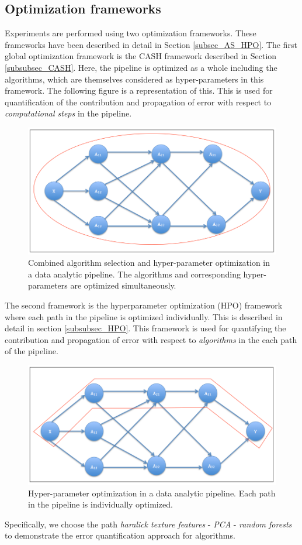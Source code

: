 \subsection{Optimization frameworks}
\label{frameworks}
Experiments are performed using two optimization frameworks. These frameworks have been described in detail in Section \ref{subsec_AS_HPO}. 
The first global optimization framework is the CASH framework described in Section \ref{subsubsec_CASH}. Here, the pipeline is optimized as a whole including the algorithms, which are themselves considered as hyper-parameters in this framework. The following figure is a representation of this. This is used for quantification of the contribution and propagation of error with respect to \textit{computational steps} in the pipeline.
\begin{figure}[ht!]
    \centering
    \includegraphics[scale=0.4]{img/EP/CASH}
    \caption{Combined algorithm selection and hyper-parameter optimization in a data analytic pipeline. The algorithms and corresponding hyper-parameters are optimized simultaneously.}
    \label{fig:CASH}
\end{figure}
The second framework is the hyperparameter optimization (HPO) framework where each path in the pipeline is optimized individually. This is described in detail in section \ref{subsubsec_HPO}. This framework is used for quantifying the contribution and propagation of error with respect to \textit{algorithms} in the each path of the pipeline.
\begin{figure}[ht!]
    \centering
    \includegraphics[scale=0.4]{img/EP/HPO}
    \caption{Hyper-parameter optimization in a data analytic pipeline. Each path in the pipeline is individually optimized.}
    \label{fig:HPO}
\end{figure}
Specifically, we choose the path \textit{haralick texture features} - \textit{PCA} - \textit{random forests} to demonstrate the error quantification approach for algorithms.

